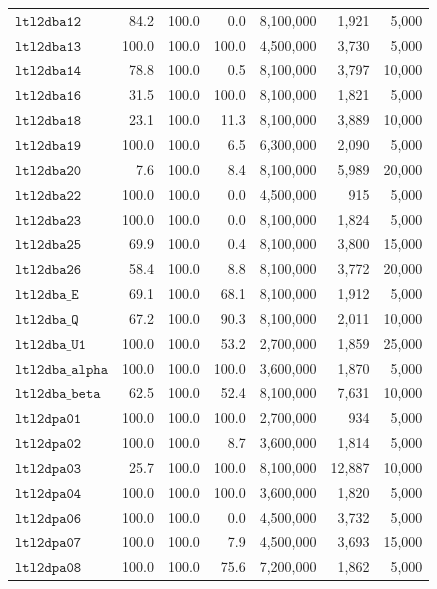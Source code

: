 \begin{small}
\begin{longtable}{p{5cm}|rrr|rrr}
$\mathtt{ltl2dba12}$ & 84.2 & 100.0 & 0.0 & 8,100,000 & 1,921 & 5,000 \\
$\mathtt{ltl2dba13}$ & 100.0 & 100.0 & 100.0 & 4,500,000 & 3,730 & 5,000 \\
$\mathtt{ltl2dba14}$ & 78.8 & 100.0 & 0.5 & 8,100,000 & 3,797 & 10,000 \\
$\mathtt{ltl2dba16}$ & 31.5 & 100.0 & 100.0 & 8,100,000 & 1,821 & 5,000 \\
$\mathtt{ltl2dba18}$ & 23.1 & 100.0 & 11.3 & 8,100,000 & 3,889 & 10,000 \\
$\mathtt{ltl2dba19}$ & 100.0 & 100.0 & 6.5 & 6,300,000 & 2,090 & 5,000 \\
$\mathtt{ltl2dba20}$ & 7.6 & 100.0 & 8.4 & 8,100,000 & 5,989 & 20,000 \\
$\mathtt{ltl2dba22}$ & 100.0 & 100.0 & 0.0 & 4,500,000 & 915 & 5,000 \\
$\mathtt{ltl2dba23}$ & 100.0 & 100.0 & 0.0 & 8,100,000 & 1,824 & 5,000 \\
$\mathtt{ltl2dba25}$ & 69.9 & 100.0 & 0.4 & 8,100,000 & 3,800 & 15,000 \\
$\mathtt{ltl2dba26}$ & 58.4 & 100.0 & 8.8 & 8,100,000 & 3,772 & 20,000 \\
$\mathtt{ltl2dba\_E}$ & 69.1 & 100.0 & 68.1 & 8,100,000 & 1,912 & 5,000 \\
$\mathtt{ltl2dba\_Q}$ & 67.2 & 100.0 & 90.3 & 8,100,000 & 2,011 & 10,000 \\
$\mathtt{ltl2dba\_U1}$ & 100.0 & 100.0 & 53.2 & 2,700,000 & 1,859 & 25,000 \\
$\mathtt{ltl2dba\_alpha}$ & 100.0 & 100.0 & 100.0 & 3,600,000 & 1,870 & 5,000 \\
$\mathtt{ltl2dba\_beta}$ & 62.5 & 100.0 & 52.4 & 8,100,000 & 7,631 & 10,000 \\
$\mathtt{ltl2dpa01}$ & 100.0 & 100.0 & 100.0 & 2,700,000 & 934 & 5,000 \\
$\mathtt{ltl2dpa02}$ & 100.0 & 100.0 & 8.7 & 3,600,000 & 1,814 & 5,000 \\
$\mathtt{ltl2dpa03}$ & 25.7 & 100.0 & 100.0 & 8,100,000 & 12,887 & 10,000 \\
$\mathtt{ltl2dpa04}$ & 100.0 & 100.0 & 100.0 & 3,600,000 & 1,820 & 5,000 \\
$\mathtt{ltl2dpa06}$ & 100.0 & 100.0 & 0.0 & 4,500,000 & 3,732 & 5,000 \\
$\mathtt{ltl2dpa07}$ & 100.0 & 100.0 & 7.9 & 4,500,000 & 3,693 & 15,000 \\
$\mathtt{ltl2dpa08}$ & 100.0 & 100.0 & 75.6 & 7,200,000 & 1,862 & 5,000 \\

\end{longtable}
\end{small}

